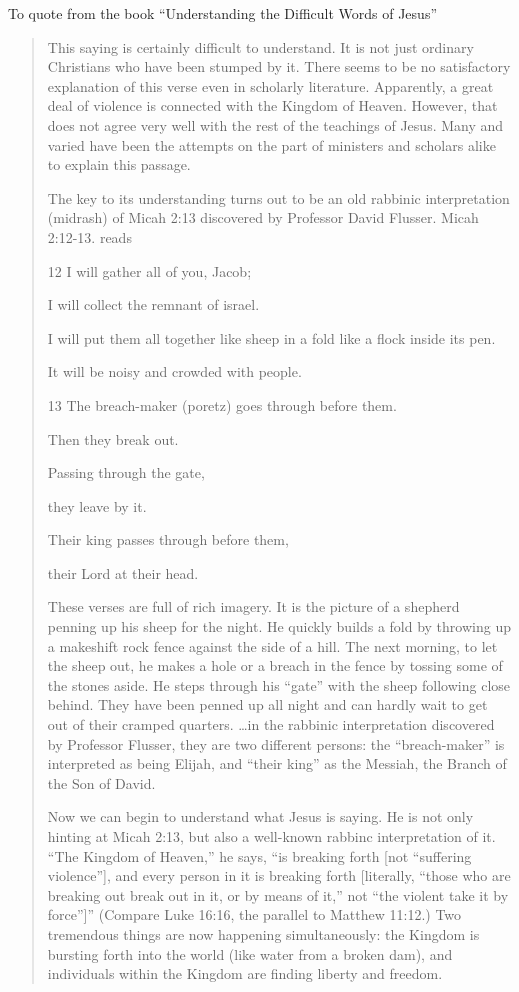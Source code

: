 \documentclass[11pt]{article}
\begin{document}
To quote from the book “Understanding the Difficult Words of Jesus”
\begin{quote}
This saying is certainly difficult to understand. It is not just
ordinary Christians who have been stumped by it. There seems to be no
satisfactory explanation of this verse even in scholarly literature.
Apparently, a great deal of violence is connected with the Kingdom of
Heaven. However, that does not agree very well with the rest of the
teachings of Jesus. Many and varied have been the attempts on the part
of ministers and scholars alike to explain this passage.

The key to its understanding turns out to be an old rabbinic
interpretation (midrash) of Micah 2:13 discovered by Professor David
Flusser. Micah 2:12-13. reads

12 I will gather all of you, Jacob;

I will collect the remnant of israel.

I will put them all together like sheep in a fold like a flock inside its pen.

It will be noisy and crowded with people.

13 The breach-maker (poretz) goes through before them.

Then they break out.

Passing through the gate,

they leave by it.

Their king passes through before them,

their Lord at their head.

These verses are full of rich imagery. It is the picture of a
shepherd penning up his sheep for the night. He quickly builds a fold
by throwing up a makeshift rock fence against the side of a hill. The
next morning, to let the sheep out, he makes a hole or a breach in the
fence by tossing some of the stones aside. He steps through his “gate”
with the sheep following close behind. They have been penned up all
night and can hardly wait to get out of their cramped quarters. …in
the rabbinic interpretation discovered by Professor Flusser, they are
two different persons: the “breach-maker” is interpreted as being
Elijah, and “their king” as the Messiah, the Branch of the Son of
David.

Now we can begin to understand what Jesus is saying. He is not only
hinting at Micah 2:13, but also a well-known rabbinc interpretation of
it. “The Kingdom of Heaven,” he says, “is breaking forth [not
“suffering violence”], and every person in it is breaking forth [literally, “those who are breaking out break out in it, or by means of it,” not “the violent take it by force”]” (Compare Luke 16:16, the parallel to Matthew 11:12.) Two tremendous things are now happening simultaneously: the Kingdom is bursting forth into the world (like water from a broken dam), and individuals within the Kingdom are finding liberty and freedom.


\end{quote}
\end{document}

